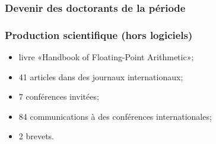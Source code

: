 \documentclass[mathsans]{beamer}
\begin{document}
\begin{frame}[fragile]
\frametitle{Devenir des doctorants de la période}
\def\angle{0}
\def\radius{2.4}
\def\cyclelist{{"lime","green","olive","pink","blue","red"}}
\newcount\cyclecount {}
\newcount\ind {}
\end{frame}

\begin{frame}
\frametitle{Production scientifique (hors logiciels)}
\begin{itemize}
   \item livre «Handbook of Floating-Point Arithmetic»;
   \item 41 articles dans des journaux internationaux;
   \item 7 conférences invitées;
   \item 84 communications à des conférences internationales;
   \item 2 brevets.
\end{itemize}
\end{frame}
\end{document}
